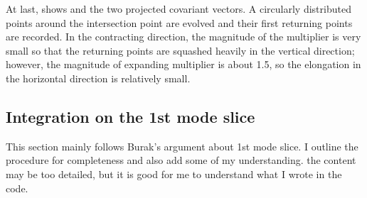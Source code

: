 At last,  shows {\PoincSec} and the
two projected covariant vectors. A circularly distributed points around
the intersection point are evolved and their first returning points are
recorded. In the contracting direction, the magnitude of the multiplier
is very small so that the returning points are squashed heavily in the
vertical direction; however, the magnitude of expanding multiplier is
about 1.5, so the elongation in the horizontal direction is relatively
small.

\clearpage
\subsection{Integration on the 1st mode slice}

This section mainly follows Burak's argument about 1st mode slice. I
outline the procedure for completeness and also add some of my
understanding. the content may be too detailed, but it is good
for me to understand what I wrote in the code.

